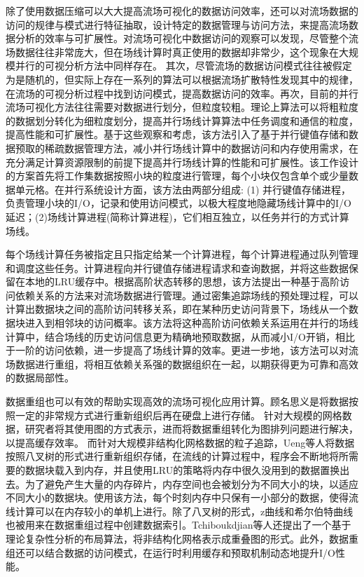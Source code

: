 除了使用数据压缩可以大大提高流场可视化的数据访问效率，还可以对流场数据的访问的规律与模式进行特征抽取，设计特定的数据管理与访问方法，来提高流场数据分析的效率与可扩展性。对流场可视化中数据访问的观察可以发现，尽管整个流场数据往往非常庞大，但在场线计算时真正使用的数据却非常少，这个现象在大规模并行的可视分析方法中同样存在。 其次，尽管流场的数据访问模式往往被假定为是随机的，但实际上存在一系列的算法可以根据流场扩散特性发现其中的规律，在流场的可视分析过程中找到访问模式，提高数据访问的效率。再次，目前的并行流场可视化方法往往需要对数据进行划分，但粒度较粗。理论上算法可以将粗粒度的数据划分转化为细粒度划分，提高并行场线计算算法中任务调度和通信的粒度，提高性能和可扩展性。基于这些观察和考虑，该方法引入了基于并行键值存储和数据预取的稀疏数据管理方法，减小并行场线计算中的数据访问和内存使用需求，在充分满足计算资源限制的前提下提高并行场线计算的性能和可扩展性。该工作设计的方案首先将工作集数据按照小块的粒度进行管理，每个小块仅包含单个或少量数据单元格。在并行系统设计方面，该方法由两部分组成: (1) 并行键值存储进程，负责管理小块的I/O，记录和使用访问模式，以极大程度地隐藏场线计算中的I/O延迟；(2)场线计算进程(简称计算进程)，它们相互独立，以任务并行的方式计算场线。

每个场线计算任务被指定且只指定给某一个计算进程，每个计算进程通过队列管理和调度这些任务。计算进程向并行键值存储进程请求和查询数据，并将这些数据保留在本地的LRU缓存中。根据高阶状态转移的思想，该方法提出一种基于高阶访问依赖关系的方法来对流场数据进行管理。通过密集追踪场线的预处理过程，可以计算出数据块之间的高阶访问转移关系，即在某种历史访问背景下，场线从一个数据块进入到相邻块的访问概率。该方法将这种高阶访问依赖关系运用在并行的场线计算中，结合场线的历史访问信息更为精确地预取数据，从而减小I/O开销，相比于一阶的访问依赖，进一步提高了场线计算的效率。更进一步地，该方法可以对流场数据进行重组，将相互依赖关系强的数据组织在一起，以期获得更为可靠和高效的数据局部性。

数据重组也可以有效的帮助实现高效的流场可视化应用计算。顾名思义是将数据按照一定的非常规方式进行重新组织后再在硬盘上进行存储。
针对大规模的网格数据，研究者将其使用图的方式表示，进而将数据重组转化为图排列问题进行解决，以提高缓存效率\parencite{BogomjakovG01,KarniBG02,YoonL06,YoonLPM05}。
而针对大规模非结构化网格数据的粒子追踪，Ueng等人\parencite{UengSM97}将数据按照八叉树的形式进行重新组织存储，在流线的计算过程中，程序会不断地将所需要的数据块载入到内存，并且使用LRU的策略将内存中很久没用到的数据置换出去。为了避免产生大量的内存碎片，内存空间也会被划分为不同大小的块，以适应不同大小的数据块。使用该方法，每个时刻内存中只保有一小部分的数据，使得流线计算可以在内存较小的单机上进行。除了八叉树的形式，z曲线和希尔伯特曲线也被用来在数据重组过程中创建数据索引\parencite{NiedermeierS96,PascucciF01}。Tchiboukdjian等人\parencite{TchiboukdjianDR10}还提出了一个基于理论复杂性分析的布局算法，将非结构化网格表示成重叠图的形式。此外，数据重组还可以结合数据的访问模式，在运行时利用缓存和预取机制动态地提升I/O性能\parencite{AkandeR13}。


